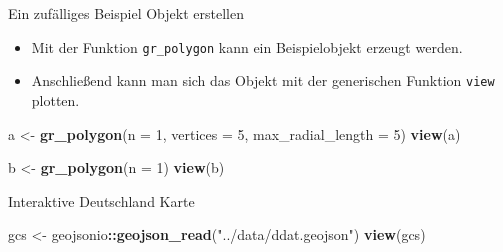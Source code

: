 \documentclass[ignorenonframetext,]{beamer}
\newenvironment{Shaded}{\begin{snugshade}}{\end{snugshade}}
\newcommand{\DataTypeTok}[1]{\textcolor[rgb]{0.13,0.29,0.53}{#1}}
\newcommand{\DecValTok}[1]{\textcolor[rgb]{0.00,0.00,0.81}{#1}}
\newcommand{\KeywordTok}[1]{\textcolor[rgb]{0.13,0.29,0.53}{\textbf{#1}}}
\newcommand{\NormalTok}[1]{#1}
\newcommand{\OperatorTok}[1]{\textcolor[rgb]{0.81,0.36,0.00}{\textbf{#1}}}
\newcommand{\StringTok}[1]{\textcolor[rgb]{0.31,0.60,0.02}{#1}}
\providecommand{\tightlist}{%
  \setlength{\itemsep}{0pt}\setlength{\parskip}{0pt}}
\begin{document}
\begin{frame}[fragile]{Ein zufälliges Beispiel Objekt erstellen}
\protect\hypertarget{ein-zufalliges-beispiel-objekt-erstellen}{}

\begin{itemize}
\tightlist
\item
  Mit der Funktion \texttt{gr\_polygon} kann ein Beispielobjekt erzeugt
  werden.
\item
  Anschließend kann man sich das Objekt mit der generischen Funktion
  \texttt{view} plotten.
\end{itemize}

\begin{Shaded}
\begin{Highlighting}[]
\NormalTok{a <-}\StringTok{ }\KeywordTok{gr_polygon}\NormalTok{(}\DataTypeTok{n =} \DecValTok{1}\NormalTok{, }\DataTypeTok{vertices =} \DecValTok{5}\NormalTok{, }\DataTypeTok{max_radial_length =} \DecValTok{5}\NormalTok{)}
\KeywordTok{view}\NormalTok{(a)}
\end{Highlighting}
\end{Shaded}

\begin{Shaded}
\begin{Highlighting}[]
\NormalTok{b <-}\StringTok{ }\KeywordTok{gr_polygon}\NormalTok{(}\DataTypeTok{n =} \DecValTok{1}\NormalTok{)}
\KeywordTok{view}\NormalTok{(b)}
\end{Highlighting}
\end{Shaded}

\end{frame}

\begin{frame}[fragile]{Interaktive Deutschland Karte}
\protect\hypertarget{interaktive-deutschland-karte}{}

\begin{Shaded}
\begin{Highlighting}[]
\NormalTok{gcs <-}\StringTok{ }\NormalTok{geojsonio}\OperatorTok{::}\KeywordTok{geojson_read}\NormalTok{(}\StringTok{"../data/ddat.geojson"}\NormalTok{)}
\KeywordTok{view}\NormalTok{(gcs)}
\end{Highlighting}
\end{Shaded}

\end{frame}
\end{document}
